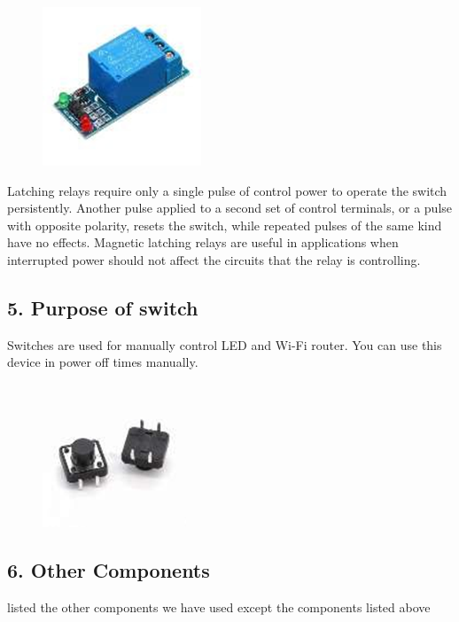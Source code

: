 \documentclass[twocolumn]{article}
\begin{document}
\begin{figure}[h]
    \centering
    \includegraphics{4.png}
    \label{fig:enter-label}
\end{figure}

\noindent Latching relays require only a single pulse of 
control power to operate the switch persistently. 
Another pulse applied to a second set of control 
terminals, or a pulse with opposite polarity, 
resets the switch, while repeated pulses of the 
same kind have no effects. Magnetic latching 
relays are useful in applications when 
interrupted power should not affect the circuits 
that the relay is controlling.


\subsection*{5. Purpose of switch}
Switches are used for manually control LED and Wi-Fi router. You can use this device in power off times manually.  

\begin{figure}[h]
    \centering
    \includegraphics{5.png}
    \label{fig:enter-label}
\end{figure}


\subsection*{6. Other Components}

listed the other components we have used except the components listed above
\end{document}
